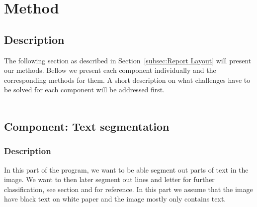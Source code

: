 \documentclass[Report.tex]{subfiles}
\begin{document}
\chapter{Method}
\label{chap:Method}
\section{Description}
The following section as described in Section~\ref{subsec:Report Layout} will present our methods. Bellow we present each component individually and the corresponding methods for them. A short description on what challenges have to
be solved for each component will be addressed first. \\ \\

\section{Component: Text segmentation}
\label{Method:Text_segmentation}

\subsection{Description}
In this part of the program, we want to be able segment out parts of text in the image. We want to then later segment out lines and letter for further classification, see section  and  for reference. In this part we assume that the image have black text on white paper and the image mostly only contains text. 
\end{document}
